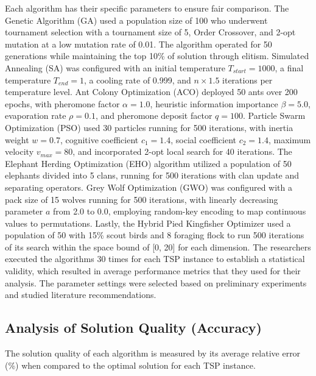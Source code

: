 Each algorithm has their specific parameters to ensure fair comparison. The Genetic Algorithm (GA) used a population size of 100 who underwent tournament selection with a tournament size of 5, Order Crossover, and 2-opt mutation at a low mutation rate of 0.01. The algorithm operated for 50 generations while maintaining the top 10\% of solution through elitism. Simulated Annealing (SA) was configured with an initial temperature $T_{start}=1000$, a final temperature $T_{end}=1$, a cooling rate of 0.999, and $n \times 1.5$ iterations per temperature level. Ant Colony Optimization (ACO) deployed 50 ants over 200 epochs, with pheromone factor $\alpha = 1.0$, heuristic information importance $\beta = 5.0$, evaporation rate $\rho = 0.1$, and pheromone deposit factor $q = 100$. Particle Swarm Optimization (PSO) used 30 particles running for 500 iterations, with inertia weight $w = 0.7$, cognitive coefficient $c_1 = 1.4$, social coefficient $c_2 = 1.4$, maximum velocity $v_{max} = 80$, and incorporated 2-opt local search for 40 iterations. The Elephant Herding Optimization (EHO) algorithm utilized a population of 50 elephants divided into 5 clans, running for 500 iterations with clan update and separating operators. Grey Wolf Optimization (GWO) was configured with a pack size of 15 wolves running for 500 iterations, with linearly decreasing parameter $a$ from 2.0 to 0.0, employing random-key encoding to map continuous values to permutations. Lastly, the Hybrid Pied Kingfisher Optimizer used a population of 50 with 15\% scout birds and 8 foraging flock to run 500 iterations of its search within the space bound of [0, 20] for each dimension. The researchers executed the algorithms 30 times for each TSP instance to establish a statistical validity, which resulted in average performance metrics that they used for their analysis. The parameter settings were selected based on preliminary experiments and studied literature recommendations.

\subsection{Analysis of Solution Quality (Accuracy)}

The solution quality of each algorithm is measured by its average relative error (\%) when compared to the optimal solution for each TSP instance.

